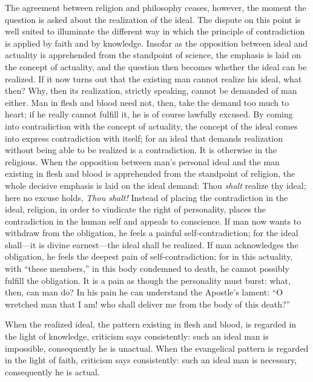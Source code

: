 \documentclass[12pt]{book}
\newcommand{\opage}[1]{\marginnote{\footnotesize\textit{[#1]}}}
\begin{document}
The agreement between religion and philosophy ceases, however, the
moment the question is asked about the realization of the ideal. The
dispute on this point is well suited to
\opage{148}\setcounter{footnote}{0}%
illuminate the different way in which the principle of contradiction is
applied by faith and by knowledge. Insofar as the opposition between
ideal and actuality is apprehended from the standpoint of science, the
emphasis is laid on the concept of actuality, and the question then
becomes whether the ideal can be realized. If it now turns out that the
existing man cannot realize his ideal, what then? Why, then its
realization, strictly speaking, cannot be demanded of man either. Man in
flesh and blood need not, then, take the demand too much to heart; if he
really cannot fulfill it, he is of course lawfully excused. By coming
into contradiction with the concept of actuality, the concept of the
ideal comes into express contradiction with itself; for an ideal that
demands realization without being able to be realized is a
contradiction. It is otherwise in the religious. When the opposition
between man's personal ideal and the man existing in flesh and blood is
apprehended from the standpoint of religion, the whole decisive emphasis
is laid on the ideal demand: Thou \textit{shalt} realize thy ideal; here
no excuse holds, \textit{Thou shalt!} Instead of placing the
contradiction in the ideal, religion, in order to vindicate the right of
personality, places the contradiction in the
human self and appeals to conscience. If man now wants to withdraw from
the obligation, he feels a painful self-contradiction; for the ideal
shall---it is divine earnest---the ideal shall be realized. If man
acknowledges the obligation, he feels the deepest pain of
self-contradiction; for in this actuality, with ``these members,'' in
this body condemned to death, he cannot possibly fulfill the
obligation. It is a pain as though the personality must burst: what,
then, can man do? In his pain he can understand the Apostle's lament:
\opage{149}\setcounter{footnote}{0}%
``O wretched man that I am! who shall deliver me from the body of this
death?''

When the realized ideal, the pattern existing in flesh and blood, is
regarded in the light of knowledge, criticism says consistently: such
an ideal man is impossible, consequently he is unactual. When the
evangelical pattern is regarded in the light of faith, criticism says
consistently: such an ideal man is necessary, consequently he is
actual.
\end{document}
